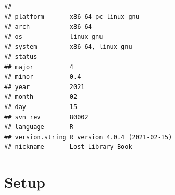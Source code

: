 \documentclass[]{book}
\begin{document}
\begin{verbatim}
##                _                           
## platform       x86_64-pc-linux-gnu         
## arch           x86_64                      
## os             linux-gnu                   
## system         x86_64, linux-gnu           
## status                                     
## major          4                           
## minor          0.4                         
## year           2021                        
## month          02                          
## day            15                          
## svn rev        80002                       
## language       R                           
## version.string R version 4.0.4 (2021-02-15)
## nickname       Lost Library Book
\end{verbatim}

\hypertarget{setup-3}{%
\section{Setup}\label{setup-3}}
\end{document}
